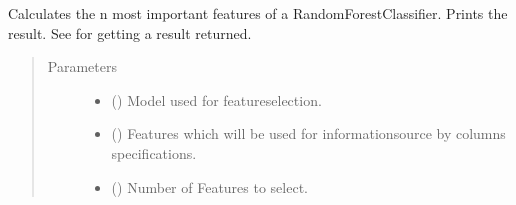 \documentclass[letterpaper,10pt,english]{sphinxmanual}
\begin{document}

\begin{fulllineitems}
\label{\detokenize{anoog.model:anoog.model.model.get_most_important_features}}
\sphinxAtStartPar
Calculates the n most important features of a RandomForestClassifier.
Prints the result. See {\hyperref[\detokenize{anoog.model:anoog.model.model.get_most_important_features_as_list}]{}} for getting a result returned.
\begin{quote}\begin{description}
\item[{Parameters}] \leavevmode\begin{itemize}
\item {} 
\sphinxAtStartPar
{} () \textendash{} Model used for feature\sphinxhyphen{}selection.

\item {} 
\sphinxAtStartPar
{} () \textendash{} Features which will be used for information\sphinxhyphen{}source by columns specifications.

\item {} 
\sphinxAtStartPar
{} () \textendash{} Number of Features to select.

\end{itemize}

\end{description}\end{quote}

\end{fulllineitems}

\end{document}
